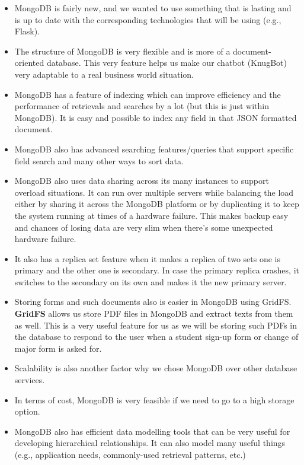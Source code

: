 \documentclass[titlepage, 12pt]{article}
\begin{document}
\begin{itemize}
    \item MongoDB is fairly new, and we wanted to use something that is lasting and is up to date with the corresponding technologies that will be using (e.g., Flask).
    \item The structure of MongoDB is very flexible and is more of a document-oriented database. This very feature helps us make our chatbot (KnugBot) very adaptable to a real business world situation.
    \item MongoDB has a feature of indexing which can improve efficiency and the performance of retrievals and searches by a lot (but this is just within MongoDB). It is easy and possible to index any field in that JSON formatted document.
    \item MongoDB also has advanced searching features/queries that support specific field search and many other ways to sort data.
    \item MongoDB also uses data sharing across its many instances to support overload situations. It can run over multiple servers while balancing the load either by sharing it across the MongoDB platform or by duplicating it to keep the system running at times of a hardware failure. This makes backup easy and chances of losing data are very slim when there’s some unexpected hardware failure.
    \item It also has a replica set feature when it makes a replica of two sets one is primary and the other one is secondary. In case the primary replica crashes, it switches to the secondary on its own and makes it the new primary server.
    \item Storing forms and such documents also is easier in MongoDB using GridFS. \textbf{GridFS} allows us store PDF files in MongoDB and extract texts from them as well. This is a very useful feature for us as we will be storing such PDFs in the database to respond to the user when a student sign-up form or change of major form is asked for.
    \item Scalability is also another factor why we chose MongoDB over other database services.
    \item In terms of cost, MongoDB is very feasible if we need to go to a high storage option.
    \item MongoDB also has efficient data modelling tools that can be very useful for developing hierarchical relationships. It can also model many useful things (e.g., application needs, commonly-used retrieval patterns, etc.)
\end{itemize}
\end{document}
